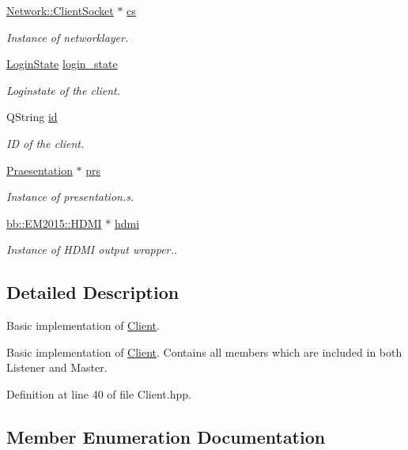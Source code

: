 \begin{DoxyCompactItemize}
\hyperlink{class_network_1_1_client_socket}{Network\+::\+Client\+Socket} $\ast$ \hyperlink{class_client_a574c321203afa8d46a4e63de1a363446}{cs}
\begin{DoxyCompactList}\small\item\em Instance of networklayer. \end{DoxyCompactList}\item 
\hyperlink{class_client_a1ea74a59c03de0d997aab2dc863adf28}{Login\+State} \hyperlink{class_client_a7bb4d5f91c7c9ac1564ac77caa95a64b}{login\+\_\+state}
\begin{DoxyCompactList}\small\item\em Loginstate of the client. \end{DoxyCompactList}\item 
Q\+String \hyperlink{class_client_a87166760a487c87b749414f2d9ba1aa9}{id}
\begin{DoxyCompactList}\small\item\em I\+D of the client. \end{DoxyCompactList}\item 
\hyperlink{class_praesentation}{Praesentation} $\ast$ \hyperlink{class_client_aae53be4d7e026f6de9416c85bf077384}{prs}
\begin{DoxyCompactList}\small\item\em Instance of presentation.\+s. \end{DoxyCompactList}\item 
\hyperlink{classbb_1_1_e_m2015_1_1_h_d_m_i}{bb\+::\+E\+M2015\+::\+H\+D\+M\+I} $\ast$ \hyperlink{class_client_af80c2e91331356e5af8db20ae1960957}{hdmi}
\begin{DoxyCompactList}\small\item\em Instance of H\+D\+M\+I output wrapper.. \end{DoxyCompactList}\end{DoxyCompactItemize}


\subsection{Detailed Description}
Basic implementation of \hyperlink{class_client}{Client}. 

Basic implementation of \hyperlink{class_client}{Client}. Contains all members which are included in both Listener and Master. 

Definition at line 40 of file Client.\+hpp.



\subsection{Member Enumeration Documentation}
\hypertarget{class_client_a1ea74a59c03de0d997aab2dc863adf28}{}
